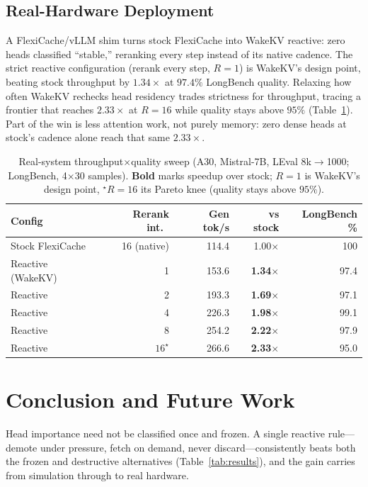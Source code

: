 \documentclass{article}
\begin{document}
\subsection{Real-Hardware Deployment}

A FlexiCache/vLLM shim turns stock FlexiCache into WakeKV reactive:
zero heads classified ``stable,'' reranking every step instead of its
native cadence. The strict reactive configuration (rerank every step,
$R{=}1$) is WakeKV's design point, beating stock throughput by
$1.34\times$ at $97.4\%$ LongBench quality. Relaxing how often WakeKV
rechecks head residency trades strictness for throughput, tracing a
frontier that reaches $2.33\times$ at $R{=}16$ while quality stays
above $95\%$ (Table~\ref{tab:m2b2}). Part of the win is less attention
work, not purely memory: zero dense heads at stock's cadence alone
reach that same $2.33\times$.

\begin{table}[h]
\centering
\footnotesize
\begin{tabular}{lrrrr}
\toprule
Config & Rerank int.\ & Gen tok/s & vs stock & LongBench \% \\
\midrule
Stock FlexiCache & 16 (native) & 114.4 & 1.00$\times$ & 100 \\
Reactive (WakeKV) & 1 & 153.6 & \textbf{1.34$\times$} & 97.4 \\
Reactive & 2 & 193.3 & \textbf{1.69$\times$} & 97.1 \\
Reactive & 4 & 226.3 & \textbf{1.98$\times$} & 99.1 \\
Reactive & 8 & 254.2 & \textbf{2.22$\times$} & 97.9 \\
Reactive & $16^\star$ & 266.6 & \textbf{2.33$\times$} & 95.0 \\
\bottomrule
\end{tabular}
\caption{Real-system throughput$\times$quality sweep (A30, Mistral-7B,
LEval 8k$\to$1000; LongBench, 4$\times$30 samples). \textbf{Bold} marks
speedup over stock; $R{=}1$ is WakeKV's design point, $^\star$$R{=}16$
its Pareto knee (quality stays above $95\%$).}
\label{tab:m2b2}
\end{table}

\raggedbottom
\enlargethispage{36pt}
\section{Conclusion and Future Work}

Head importance need not be classified once and frozen. A single
reactive rule---demote under pressure, fetch on demand, never
discard---consistently beats both the frozen and destructive
alternatives (Table~\ref{tab:results}), and the gain carries from
simulation through to real hardware.
\end{document}
